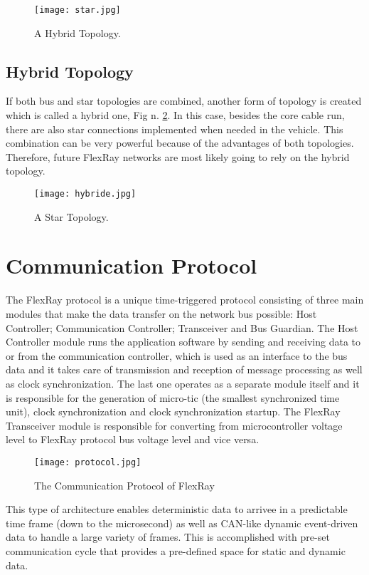 \documentclass[conference]{IEEEtran}
\begin{document}
\begin{figure}[htbp]
 \centerline{ \texttt{[image: star.jpg]}}
  \caption{A Hybrid Topology.}
  \label{fig:star}
\end{figure}

\subsection{Hybrid Topology}
If both bus and star topologies are combined, another form of topology is created which is called a hybrid one, Fig n. \ref{fig:hybrid}. In this case, besides the core cable run, there are also star connections implemented when needed in the vehicle. This combination can be very powerful because of the advantages of both topologies. Therefore, future FlexRay networks are most likely going to rely on the hybrid topology.

\begin{figure}[htbp]
 \centerline{ \texttt{[image: hybride.jpg]}}
  \caption{A Star Topology.}
  \label{fig:hybrid}
\end{figure}

\section{Communication Protocol}

The FlexRay protocol is a unique time-triggered protocol consisting of three main modules that make the data transfer on the network bus possible: Host Controller; Communication Controller;  Transceiver and Bus Guardian.
The Host Controller module runs the application software by sending and receiving data to or from the communication controller, which is used as an interface to the bus data and it takes care of transmission and reception of message processing as well as clock synchronization. The last one operates as a separate module itself and it is responsible for the generation of micro-tic (the smallest synchronized time unit), clock synchronization and clock synchronization startup. The FlexRay Transceiver module is responsible for converting from microcontroller voltage level to FlexRay protocol bus voltage level and vice versa.

\begin{figure}[htbp]
 \centerline{ \texttt{[image: protocol.jpg]}}
  \caption{The Communication Protocol of FlexRay}
  \label{fig:protocol}
\end{figure}

This type of architecture enables deterministic data to arrivee in a predictable time frame (down to the microsecond) as well as CAN-like dynamic event-driven data to handle a large variety of frames. This is accomplished with pre-set communication cycle that provides a pre-defined space for static and dynamic data.
\end{document}
